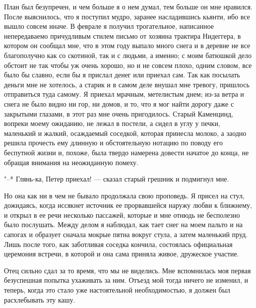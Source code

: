 План был  безупречен, и чем  больше я о нем  думал, тем больше  он мне
нравился. После выяснилось, что я поступил мудро, заранее насладившись
кьянти, ибо все вышло совсем  иначе. В феврале я получил трогательное,
написанное непередаваемо причудливым стилем письмо от хозяина трактира
Нидеггера, в  котором он  сообщал мне,  что в  этом году  выпало много
снега и в деревне не все благополучно как со скотиной, так и с людьми,
а именно; с  моим батюшкой дело обстоит не так  чтобы уж очень хорошо,
но и  не совсем  плохо, одним словом,  все было бы  славно, если  бы я
прислал  денег  или  приехал  сам.  Так как  посылать  деньги  мне  не
хотелось,  а  старик и  в  самом  деле  внушал мне  тревогу,  пришлось
отправиться  туда самому.  Я приехал  мрачным, метелистым  днем; из-за
ветра и снега  не было видно ни гор,  ни домов, и то, что  я мог найти
дорогу даже  с закрытыми  глазами, в этот  раз мне  очень пригодилось.
Старый Каменцинд, вопреки моему ожиданию,  не лежал в постели, а сидел
в  углу у  печки,  маленький и  жалкий,  осаждаемый соседкой,  которая
принесла молоко, а заодно решила  прочесть ему длинную и обстоятельную
нотацию по поводу его беспутной  жизни и, похоже, была твердо намерена
довести начатое до конца, не обращая внимания на неожиданную помеху.

"--* Глянь-ка,  Петер приехал! ---  сказал старый грешник  и подмигнул
мне.

Но она как ни  в чем не бывало продолжала свою  проповедь. Я присел на
стул, дожидаясь, когда иссякнет  источник ее прорвавшейся наружу любви
к  ближнему, и  открыл в  ее речи  несколько пассажей,  которые и  мне
отнюдь не бесполезно было послушать.  Между делом я наблюдал, как тает
снег  на моем  пальто и  на сапогах  и образует  сначала мокрые  пятна
вокруг стула, а затем маленький  пруд. Лишь после того, как заботливая
соседка кончила, состоялась официальная церемония встречи, в которой и
она сама приняла живое, дружеское участие.

Отец сильно  сдал за  то время,  что мы  не виделись.  Мне вспомнилась
моя  первая безуспешная  попытка ухаживать  за ним.  Отъезд мой  тогда
ничего  не  изменил,  и  теперь, когда  это  стало  уже  настоятельной
необходимостью, я должен был расхлебывать эту кашу.

